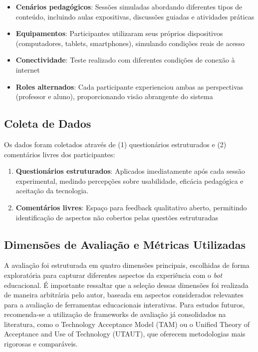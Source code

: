 \begin{itemize}
\item \textbf{Cenários pedagógicos}: Sessões simuladas abordando diferentes
tipos de conteúdo, incluindo aulas expositivas, discussões guiadas e atividades
práticas
\item \textbf{Equipamentos}: Participantes utilizaram seus próprios dispositivos
(computadores, tablets, smartphones), simulando condições reais de acesso
\item \textbf{Conectividade}: Teste realizado com diferentes condições de
conexão à internet
\item \textbf{Roles alternados}: Cada participante experienciou ambas as
perspectivas (professor e aluno), proporcionando visão abrangente do sistema
\end{itemize}

\subsection{Coleta de Dados}
\label{subsec:coleta}

Os dados foram coletados através de (1) questionários estruturados e (2)
comentários livres dos participantes:

\begin{enumerate}
\item \textbf{Questionários estruturados}: Aplicados imediatamente após cada
sessão experimental, medindo percepções sobre usabilidade, eficácia pedagógica e
aceitação da tecnologia.
\item \textbf{Comentários livres}: Espaço para feedback qualitativo aberto,
permitindo identificação de aspectos não cobertos pelas questões estruturadas
\end{enumerate}

\subsection{Dimensões de Avaliação e Métricas Utilizadas}
\label{subsec:dimensoes-metricas}

A avaliação foi estruturada em quatro dimensões principais, escolhidas de forma
exploratória para capturar diferentes aspectos da experiência com o \textit{bot}
educacional. É importante ressaltar que a seleção dessas dimensões foi realizada
de maneira arbitrária pelo autor, baseada em aspectos considerados relevantes
para a avaliação de ferramentas educacionais interativas. Para estudos futuros,
recomenda-se a utilização de frameworks de avaliação já consolidados na
literatura, como o Technology Acceptance Model (TAM) ou o Unified Theory of
Acceptance and Use of Technology (UTAUT), que oferecem metodologias mais
rigorosas e comparáveis.

